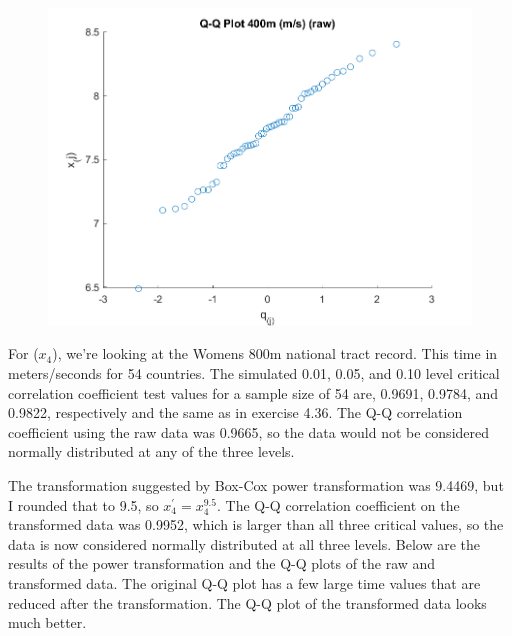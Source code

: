 \begin{center}
    \begin{figure}[H]
        \centering
        \includegraphics[scale=0.6]{./matlab/chapter-4/sol4.37.qq.3.png}
    \end{figure}
\end{center}

For ($x_{4}$), we're looking at the Womens 800m national tract record. This time in meters/seconds for 54 countries. The simulated 0.01, 0.05, and 0.10 level critical correlation coefficient test values for a sample size of 54 are, 0.9691, 0.9784, and 0.9822, respectively and the same as in exercise 4.36. The Q-Q correlation coefficient using the raw data was 0.9665, so the data would not be considered normally distributed at any of the three levels.

The transformation suggested by Box-Cox power transformation was 9.4469, but I rounded that to 9.5, so $x_{4}^{\prime} = x_{4}^{9.5}$.
The Q-Q correlation coefficient on the transformed data was 0.9952, which is larger than all three critical values, so the data is now considered normally distributed at all three levels.
Below are the results of the power transformation and the Q-Q plots of the raw and transformed data.
The original Q-Q plot has a few large time values that are reduced after the transformation. The Q-Q plot of the transformed data looks much better.

